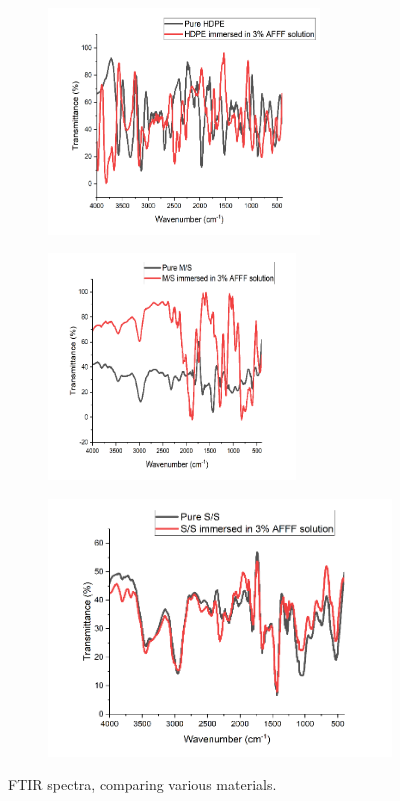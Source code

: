 \documentclass[12pt]{report}
\begin{document}
\begin{figure}[H]
\centering

\begin{subfigure}{.45\textwidth}
    \includegraphics[height=6cm, width=\textwidth]{pure_hdpe_ftir_spectra.png}
    \caption{}
\end{subfigure}
\begin{subfigure}{.45\textwidth}
    \includegraphics[height=6cm, width=\textwidth]{pure_ms_ftir_spetra.png}
    \caption{}
\end{subfigure}
\begin{subfigure}{.45\textwidth}
    \includegraphics[width=\textwidth]{pure_ss_ftir_spectra.png}
    \caption{}
\end{subfigure}

\caption{FTIR spectra, comparing various materials.}
\label{ch5:figure:materials}
\end{figure}
\end{document}
